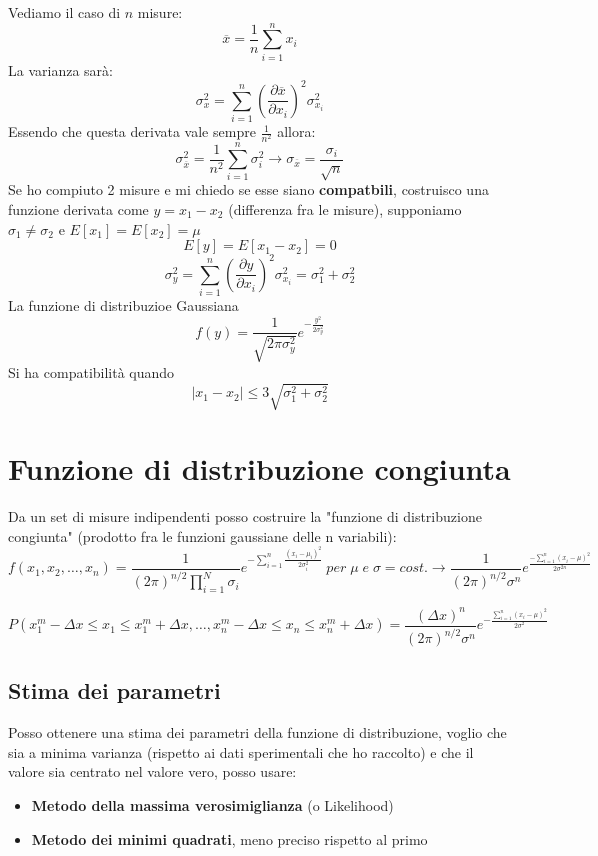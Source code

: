 \documentclass{article}
\theoremstyle{remark}
\begin{document}
\vspace{1cm}

Vediamo il caso di $n$ misure:
\[
\overline{x}=\frac{1}{n}\sum_{i=1}^n x_i
\]
La varianza sarà:
\[
\sigma_x^2=\sum_{i=1}^n \left(\frac{\partial \overline{x}}{\partial x_i}\right)^2 \sigma_{x_i}^2
\]
Essendo che questa derivata vale sempre $\frac{1}{n^2}$ allora:
\[
\sigma_{\overline{x}}^2=\frac{1}{n^2} \sum_{i=1}^n \sigma_i^2 \rightarrow \sigma_{\overline{x}}=\frac{\sigma_i }{\sqrt{n}}
\]
Se ho compiuto 2 misure e mi chiedo se esse siano \textbf{compatbili}, costruisco una funzione derivata come $y=x_1-x_2$ (differenza fra le misure), supponiamo $\sigma_1 \neq \sigma_2$ e $E[x_1]=E[x_2]=\mu$
\[
E[y]=E[x_1-x_2]=0
\]   
\[
\sigma_y^2=\sum_{i=1}^{n} \left(\frac{\partial y}{\partial x_i}\right)^2 \sigma_{x_i}^2=\sigma_1^2+\sigma_2^2
\]
La funzione di distribuzioe Gaussiana 
\[
f(y)=\frac{1}{\sqrt{2\pi \sigma_y^2}}e^{-\frac{y^2}{2\sigma_y^2}}
\]
Si ha compatibilità quando
\[
\left| x_1-x_2 \right| \leq 3\sqrt{{\sigma_1^2+\sigma_2^2}}
\]

\section{Funzione di distribuzione congiunta}
Da un set di misure indipendenti posso costruire la "funzione di distribuzione congiunta" (prodotto fra le funzioni gaussiane delle n variabili):
\begin{equation*}
    f(x_1, x_2, \ldots, x_n) = \frac{1}{(2\pi)^{n/2} \prod_{i=1}^{N}\sigma_i} e^{-\sum_{i=1}^n \frac{(x_i - \mu_i)^2}{2\sigma_i^2}} \: per \; \mu \; e \; \sigma=cost. \rightarrow \frac{1}{(2\pi)^{n/2} \sigma^n} e^{\frac{-\sum_{i=1}^n (x_i - \mu)^2}{2\sigma^{2n}}}
    \end{equation*}

    \begin{equation*}
        P(x_1^m - \Delta x \leq x_1 \leq x_1^m + \Delta x, \ldots, x_n^m - \Delta x \leq x_n \leq x_n^m + \Delta x) = \frac{(\Delta x)^n}{(2\pi)^{n/2} \sigma^n} e^{-\frac{\sum_{i=1}^n (x_i - \mu)^2}{2\sigma^2}}
        \end{equation*}

\subsection{Stima dei parametri}
Posso ottenere una stima dei parametri della funzione di distribuzione, voglio che sia a minima varianza (rispetto ai dati sperimentali che ho raccolto) e che il valore sia centrato nel valore vero, posso usare:
\begin{itemize}
    \item \textbf{Metodo della massima verosimiglianza} (o Likelihood)
    \item \textbf{Metodo dei minimi quadrati}, meno preciso rispetto al primo
\end{itemize}
\end{document}
